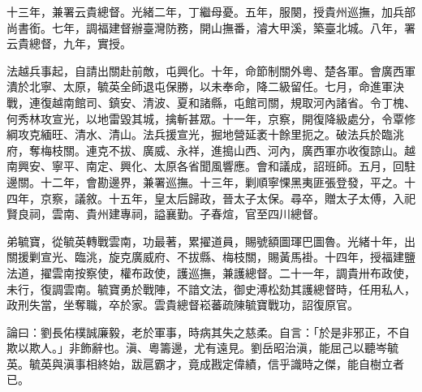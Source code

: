 \begin{pinyinscope}
十三年，兼署云貴總督。光緒二年，丁繼母憂。五年，服闋，授貴州巡撫，加兵部尚書銜。七年，調福建督辦臺灣防務，開山撫番，濬大甲溪，築臺北城。八年，署云貴總督，九年，實授。

法越兵事起，自請出關赴前敵，屯興化。十年，命節制關外粵、楚各軍。會廣西軍潰於北寧、太原，毓英全師退屯保勝，以未奉命，降二級留任。七月，命進軍決戰，連復越南館司、鎮安、清波、夏和諸縣，屯館司關，規取河內諸省。令丁槐、何秀林攻宣光，以地雷毀其城，擒斬甚眾。十一年，京察，開復降級處分，令覃修綱攻克緬旺、清水、清山。法兵援宣光，掘地營延袤十餘里扼之。破法兵於臨洮府，奪梅枝關。連克不拔、廣威、永祥，進搗山西、河內，廣西軍亦收復諒山。越南興安、寧平、南定、興化、太原各省聞風響應。會和議成，詔班師。五月，回駐邊關。十二年，會勘邊界，兼署巡撫。十三年，剿順寧惈黑夷匪張登發，平之。十四年，京察，議敘。十五年，皇太后歸政，晉太子太保。尋卒，贈太子太傅，入祀賢良祠，雲南、貴州建專祠，謚襄勤。子春煊，官至四川總督。

弟毓寶，從毓英轉戰雲南，功最著，累擢道員，賜號額圖琿巴圖魯。光緒十年，出關援剿宣光、臨洮，旋克廣威府、不拔縣、梅枝關，賜黃馬褂。十四年，授福建鹽法道，擢雲南按察使，權布政使，護巡撫，兼護總督。二十一年，調貴卅布政使，未行，復調雲南。毓寶勇於戰陣，不諳文法，御史溥松劾其護總督時，任用私人，政刑失當，坐奪職，卒於家。雲貴總督崧蕃疏陳毓寶戰功，詔復原官。

論曰：劉長佑樸誠廉毅，老於軍事，時病其失之慈柔。自言：「於是非邪正，不自欺以欺人。」非飾辭也。滇、粵籌邊，尤有遠見。劉岳昭治滇，能屈己以聽岑毓英。毓英與滇事相終始，跋扈霸才，竟成戡定偉績，信乎識時之傑，能自樹立者已。


\end{pinyinscope}